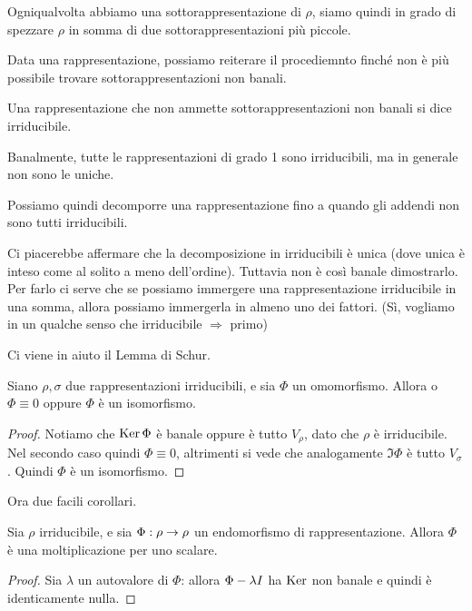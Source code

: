     Ogniqualvolta abbiamo una sottorappresentazione di $\rho$, siamo quindi in grado di spezzare $\rho$ in somma di due sottorappresentazioni più piccole. 
 
    Data una rappresentazione, possiamo reiterare il procediemnto finché non è più possibile trovare sottorappresentazioni non banali.
    
    \begin{mydef}
      Una rappresentazione che non ammette sottorappresentazioni non banali si dice irriducibile.
    \end{mydef}
    
    Banalmente, tutte le rappresentazioni di grado 1 sono irriducibili, ma in generale non sono le uniche.
    
    Possiamo quindi decomporre una rappresentazione fino a quando gli addendi non sono tutti irriducibili.
    
    Ci piacerebbe affermare che la decomposizione in irriducibili è unica (dove unica è inteso come al solito a meno dell'ordine). Tuttavia non è così banale dimostrarlo. Per farlo ci serve che se possiamo immergere una rappresentazione irriducibile in una somma, allora possiamo immergerla in almeno uno dei fattori. (Sì, vogliamo in un qualche senso che irriducibile $\Rightarrow$ primo)
    
    Ci viene in aiuto il Lemma di Schur.
    
    \begin{mytheorem}
     Siano $\rho,\sigma$ due rappresentazioni irriducibili, e sia $\Phi$ un omomorfismo. Allora o $\Phi \equiv 0$ oppure $\Phi$ è un isomorfismo.
    \end{mytheorem}
    \begin{proof}
     Notiamo che $\operatorname{Ker} \Phi$ è banale oppure è tutto $V_\rho$, dato che $\rho$ è irriducibile. Nel secondo caso quindi $\Phi\equiv 0$, altrimenti si vede che analogamente $\Im \Phi$ è tutto $V_\sigma$. Quindi $\Phi$ è un isomorfismo.
    \end{proof}
    
    Ora due facili corollari.
    
    \begin{mycor}
     Sia $\rho$ irriducibile, e sia $\Phi: \rho \rightarrow \rho$ un endomorfismo di rappresentazione. Allora $\Phi$ è una moltiplicazione per uno scalare. 
    \end{mycor}
    \begin{proof}
      Sia $\lambda$ un autovalore di $\Phi$: allora $\Phi-\lambda I$ ha $\operatorname{Ker}$ non banale e quindi è identicamente nulla.
    \end{proof}

